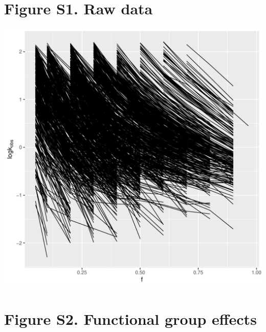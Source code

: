 \documentclass[
]{article}
\begin{document}
\newpage{}

\hypertarget{figure-s1.-raw-data}{%
\section{Figure S1. Raw data}\label{figure-s1.-raw-data}}

\includegraphics{../deliv/figures/manuscript/supplement/raw-data.pdf}

\newpage{}

\hypertarget{figure-s2.-functional-group-effects}{%
\section{Figure S2. Functional group
effects}\label{figure-s2.-functional-group-effects}}
\end{document}
